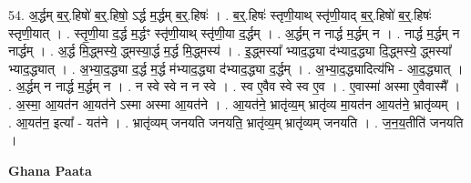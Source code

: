 \documentclass[17pt]{extarticle}
\begin{document}
54. अ॒र्द्धम् ब॒र्॒.हिषो॑ ब॒र्॒.हिषो॒ ऽर्द्ध म॒र्द्धम् ब॒र्॒.हिषः॑ । . ब॒र्॒.हिषः॑ स्तृणी॒याथ् स्तृ॑णी॒याद् ब॒र्॒.हिषो॑ ब॒र्॒.हिषः॑ स्तृणी॒यात् । . स्तृ॒णी॒या द॒र्द्ध म॒र्द्धꣳ स्तृ॑णी॒याथ् स्तृ॑णी॒या द॒र्द्धम् । . अ॒र्द्धम् न नार्द्ध म॒र्द्धम् न । . नार्द्ध म॒र्द्धम् न नार्द्धम् । . अ॒र्द्ध मि॒द्ध्मस्ये॒ द्ध्मस्या॒र्द्ध म॒र्द्ध मि॒द्ध्मस्य॑ । . इ॒द्ध्मस्या᳚ भ्याद॒द्ध्या द॑भ्याद॒द्ध्या दि॒द्ध्मस्ये॒ द्ध्मस्या᳚ भ्याद॒द्ध्यात् । . अ॒भ्या॒द॒द्ध्या द॒र्द्ध म॒र्द्ध म॑भ्याद॒द्ध्या द॑भ्याद॒द्ध्या द॒र्द्धम् । . अ॒भ्या॒द॒द्ध्यादित्य॑भि - आ॒द॒द्ध्यात् । . अ॒र्द्धम् न नार्द्ध म॒र्द्धम् न । . न स्वे स्वे न न स्वे । . स्व ए॒वैव स्वे स्व ए॒व । . ए॒वास्मा॑ अस्मा ए॒वैवास्मै᳚ । . अ॒स्मा॒ आ॒यत॑न आ॒यत॑ने ऽस्मा अस्मा आ॒यत॑ने । . आ॒यत॑ने॒ भ्रातृ॑व्य॒म् भ्रातृ॑व्य मा॒यत॑न आ॒यत॑ने॒ भ्रातृ॑व्यम् । . आ॒यत॑न॒ इत्या᳚ - यत॑ने । . भ्रातृ॑व्यम् जनयति जनयति॒ भ्रातृ॑व्य॒म् भ्रातृ॑व्यम् जनयति । . ज॒न॒य॒तीति॑ जनयति । \newline

\textbf{Ghana Paata } \newline
\end{document}
